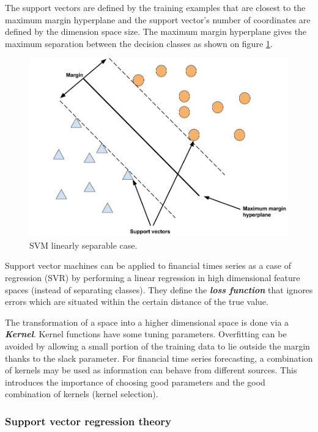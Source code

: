 \documentclass[11pt,a4paper,oneside]{book}
\begin{document}
The support vectors are defined by the training examples that are closest to the maximum margin hyperplane and the support vector's number of coordinates are defined by the dimension space size. The maximum margin hyperplane gives the maximum separation between the decision classes as shown on figure \ref{fig:svm_linear_sep}. 

\begin{figure}[!h]
  \centering
    \includegraphics[scale=0.3]{img/svm1.png}
  \caption{SVM linearly separable case.}
  \label{fig:svm_linear_sep}
\end{figure}

Support vector machines can be applied to financial times series as a case of regression (SVR) by performing a linear regression in high dimensional feature spaces (instead of separating classes). They define the \textit{\textbf{loss function}} that ignores errors which are situated within the certain distance of the true value.

The transformation of a space into a higher dimensional space is done via a \textit{\textbf{Kernel}}. Kernel functions have some tuning parameters. Overfitting can be avoided by allowing a small portion of the training data to lie outside the margin thanks to the slack parameter. For financial time series forecasting, a combination of kernels may be used as information can behave from different sources. This introduces the importance of choosing good parameters and the good combination of kernels (kernel selection). \cite{kim}\cite{liwang}\cite{Smola}


\subsubsection{Support vector regression theory}
\end{document}
